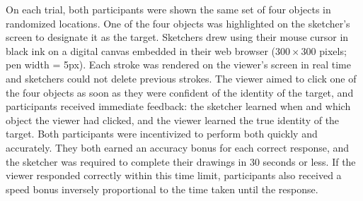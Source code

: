 \documentclass[10pt,letterpaper]{article}
\begin{document}
On each trial, both participants were shown the same set of four objects in randomized locations.
One of the four objects was highlighted on the sketcher's screen to designate it as the target.
Sketchers drew using their mouse cursor in black ink on a digital canvas embedded in their web browser ($300 \times 300$ pixels; pen width = 5px).
Each stroke was rendered on the viewer's screen in real time and sketchers could not delete previous strokes.
The viewer aimed to click one of the four objects as soon as they were confident of the identity of the target, and participants received immediate feedback: the sketcher learned when and which object the viewer had clicked, and the viewer learned the true identity of the target.
Both participants were incentivized to perform both quickly and accurately.
They both earned an accuracy bonus for each correct response, and the sketcher was required to complete their drawings in 30 seconds or less.
If the viewer responded correctly within this time limit, participants also received a speed bonus inversely proportional to the time taken until the response.


\end{document}
